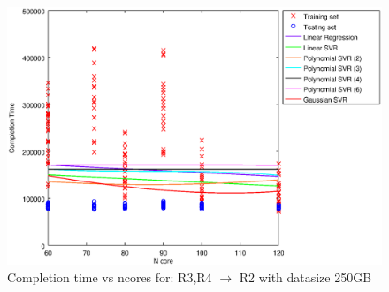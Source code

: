 
\begin {figure}[hbtp]
\centering
\includegraphics[width=\textwidth]{output/R3_R4_VS_R2_250_ALL_FEATURES/plot_R3_R4_VS_R2_250.eps}
\caption{Completion time vs ncores for: R3,R4 $\rightarrow$ R2 with datasize 250GB}
\label{fig:coreonly_linear_R3,R4_R2_250}
\end {figure}
